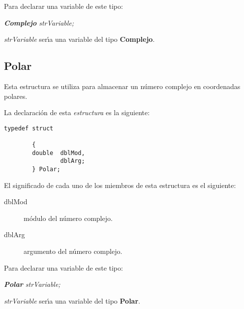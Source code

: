 Para declarar una variable de este tipo:

\begin{center}
\emph{\textbf{Complejo} strVariable;}
\end{center}

\emph{strVariable} ser\'{\i}a una variable del tipo \textbf{Complejo}.

\newpage

\subsection{Polar}
Esta estructura se utiliza para almacenar un n\'umero complejo en 
coordenadas polares.\newline

La declaraci\'on de esta \emph{estructura} es la siguiente:

\begin{verbatim}
typedef struct

        {
        double  dblMod,
                dblArg;	
        } Polar;
\end{verbatim}

El significado de cada uno de los miembros de esta estructura es el siguiente:

\begin{description}
\item[dblMod] m\'odulo del n\'umero complejo.
\item[dblArg] argumento del n\'umero complejo.
\end{description}

Para declarar una variable de este tipo:

\begin{center}
\emph{\textbf{Polar} strVariable;}
\end{center}

\emph{strVariable} ser\'{\i}a una variable del tipo \textbf{Polar}.

